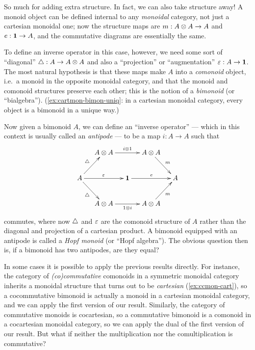 \begin{props}
So much for adding extra structure.
In fact, we can also take structure away!
A monoid object can be defined internal to any \emph{monoidal} category, not just a cartesian monoidal one; now the structure maps are $m:A\otimes A\to A$ and $e:\mathbf{1}\to A$, and the commutative diagrams are essentially the same.

To define an inverse operator in this case, however, we need some sort of ``diagonal'' $\triangle:A\to A\otimes A$ and also a ``projection'' or ``augmentation'' $\varepsilon:A\to \mathbf{1}$.
The most natural hypothesis is that these maps make $A$ into a \emph{comonoid} object, i.e.\ a monoid in the opposite monoidal category, and that the monoid and comonoid structures preserve each other; this is the notion of a \emph{bimonoid} (or ``bialgebra'').
(\cref{ex:cartmon-bimon-uniq}: in a cartesian monoidal category, every object is a bimonoid in a unique way.)

Now given a bimonoid $A$, we can define an ``inverse operator'' --- which in this context is usually called an \emph{antipode} --- to be a map $i:A\to A$ such that
\begin{equation}
  \vcenter{\xymatrix@C=1pc{& A\tensor A \ar[rr]^{i\tensor 1} && A\tensor A \ar[dr]^m \\
      A \ar[ur]^{\comult} \ar[dr]_{\comult} \ar[rr]^{\counit} && \one \ar[rr]^{e} && A \\
      & A\tensor A \ar[rr]_{1\tensor i} && A\tensor A \ar[ur]_{m}}}
\end{equation}
commutes, where now $\triangle$ and $\varepsilon$ are the comonoid structure of $A$ rather than the diagonal and projection of a cartesian product.
A bimonoid equipped with an antipode is called a \emph{Hopf monoid} (or ``Hopf algebra'').
The obvious question then is, if a bimonoid has two antipodes, are they equal?

In some cases it is possible to apply the previous results directly.
For instance, the category of \emph{(co)commutative} comonoids in a symmetric monoidal category inherits a monoidal structure that turns out to be \emph{cartesian} (\cref{ex:ccmon-cart}), so a cocommutative bimonoid is actually a monoid in a cartesian monoidal category, and we can apply the first version of our result.
Similarly, the category of commutative monoids is cocartesian, so a commutative bimonoid is a comonoid in a cocartesian monoidal category, so we can apply the dual of the first version of our result.
But what if neither the multiplication nor the comultiplication is commutative?


\end{props}

